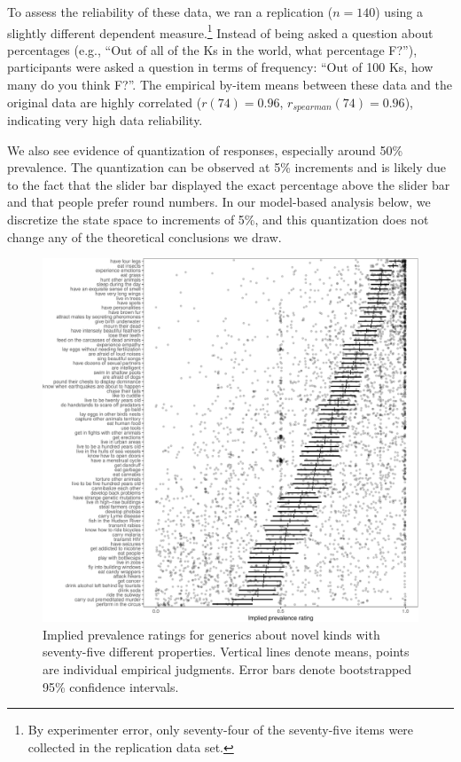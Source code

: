 \documentclass[floatsintext,man]{apa6}
\let\rmarkdownfootnote\footnote%
\def\footnote{\protect\rmarkdownfootnote}
\begin{document}
To assess the reliability of these data, we ran a replication (\(n=140\)) using a slightly different dependent measure.\footnote{By experimenter error, only seventy-four of the seventy-five items were collected in the replication data set.}
Instead of being asked a question about percentages (e.g., \enquote{Out of all of the Ks in the world, what percentage F?}), participants were asked a question in terms of frequency: \enquote{Out of 100 Ks, how many do you think F?}.
The empirical by-item means between these data and the original data are highly correlated (\(r(74) = 0.96\), \(r_{spearman}(74)= 0.96\)), indicating very high data reliability.

We also see evidence of quantization of responses, especially around 50\% prevalence. The quantization can be observed at 5\% increments and is likely due to the fact that the slider bar displayed the exact percentage above the slider bar and that people prefer round numbers. 
In our model-based analysis below, we discretize the state space to increments of 5\%, and this quantization does not change any of the theoretical conclusions we draw.


\begin{figure}
\centering
\includegraphics{genint_files/figure-latex/genint-empiricalData-1.pdf}
\caption{\label{fig:genint-empiricalData}Implied prevalence ratings for generics about novel kinds with seventy-five different properties. Vertical lines denote means, points are individual empirical judgments. Error bars denote bootstrapped 95\% confidence intervals.}
\end{figure}
\end{document}
